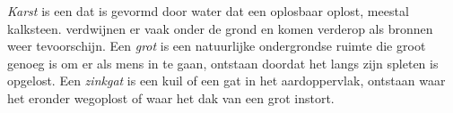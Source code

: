 \begin{definition}\label{def:g9:landforms:karst}
\emph{Karst} is een  dat is gevormd door water dat
een oplosbaar  oplost, meestal kalksteen.  verdwijnen er
vaak onder de grond en komen verderop als bronnen weer tevoorschijn. Een
\emph{grot} is een natuurlijke ondergrondse ruimte die groot
genoeg is om er als mens in te gaan, ontstaan doordat het  langs
zijn spleten is opgelost. Een \emph{zinkgat} is een kuil of
een gat in het aardoppervlak, ontstaan waar het  eronder wegoplost
of waar het dak van een grot instort.
\end{definition}

